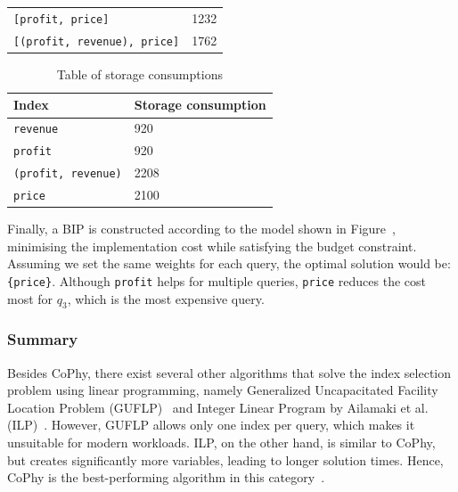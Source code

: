 \begin{example}
\begin{table}[!ht]
\begin{tabular}{ll}
            \texttt{[profit, price]} & 1232  \\
            \texttt{[(profit, revenue), price]} & 1762  \\
            \bottomrule
        \end{tabular}
    \end{table}
    \begin{table}[!ht]
        \centering
        \caption{Table of storage consumptions}
        \def\arraystretch{1.20}
        \begin{tabular}{ll}
            \toprule
            \textbf{Index} & \textbf{Storage consumption} \\
            \midrule
            \texttt{revenue} & 920 \\
            \texttt{profit} & 920 \\
            \texttt{(profit, revenue)} & 2208 \\
            \texttt{price} & 2100 \\
            \bottomrule
        \end{tabular}
        \vspace{1em}
\end{table}

Finally, a BIP is constructed according to the model shown in Figure~, minimising the implementation cost while satisfying the budget constraint. Assuming we set the same weights for each query, the optimal solution would be:\texttt{\{price\}}. Although \texttt{profit} helps for multiple queries, \texttt{price} reduces the cost most for $q_3$, which is the most expensive query.
\end{example}

\subsubsection{Summary}
Besides CoPhy, there exist several other algorithms that solve the index selection problem using linear programming, namely Generalized Uncapacitated Facility Location Problem (GUFLP)~\citep{GUFLP96} and Integer Linear Program by Ailamaki et al. (ILP)~\citep{ILP07}. However, GUFLP allows only one index per query, which makes it unsuitable for modern workloads. ILP, on the other hand, is similar to CoPhy, but creates significantly more variables, leading to longer solution times. Hence, CoPhy is the best-performing algorithm in this category~\citep{CoPhy11}.

